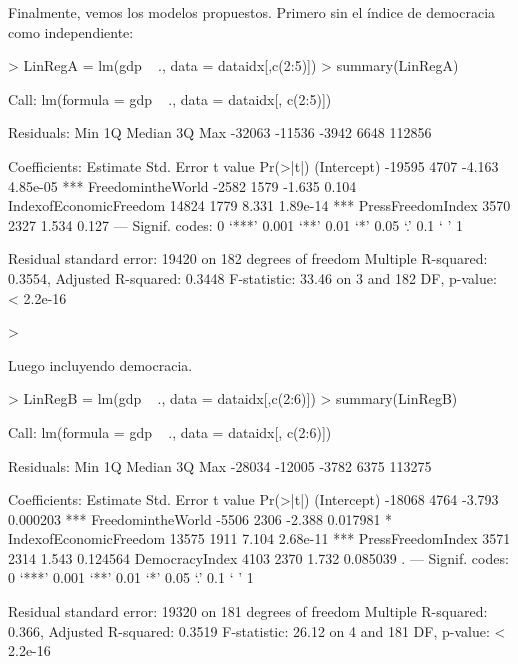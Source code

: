 \documentclass{article}
\begin{document}
Finalmente, vemos los modelos propuestos. Primero sin el índice de democracia como independiente:
\begin{Schunk}
\begin{Sinput}
> LinRegA = lm(gdp ~ ., data = dataidx[,c(2:5)])
> summary(LinRegA)
\end{Sinput}
\begin{Soutput}
Call:
lm(formula = gdp ~ ., data = dataidx[, c(2:5)])

Residuals:
   Min     1Q Median     3Q    Max 
-32063 -11536  -3942   6648 112856 

Coefficients:
                       Estimate Std. Error t value Pr(>|t|)    
(Intercept)              -19595       4707  -4.163 4.85e-05 ***
FreedomintheWorld         -2582       1579  -1.635    0.104    
IndexofEconomicFreedom    14824       1779   8.331 1.89e-14 ***
PressFreedomIndex          3570       2327   1.534    0.127    
---
Signif. codes:  0 ‘***’ 0.001 ‘**’ 0.01 ‘*’ 0.05 ‘.’ 0.1 ‘ ’ 1

Residual standard error: 19420 on 182 degrees of freedom
Multiple R-squared:  0.3554,	Adjusted R-squared:  0.3448 
F-statistic: 33.46 on 3 and 182 DF,  p-value: < 2.2e-16
\end{Soutput}
\begin{Sinput}
> 
\end{Sinput}
\end{Schunk}

Luego incluyendo democracia.

\begin{Schunk}
\begin{Sinput}
> LinRegB = lm(gdp ~ ., data = dataidx[,c(2:6)])
> summary(LinRegB)
\end{Sinput}
\begin{Soutput}
Call:
lm(formula = gdp ~ ., data = dataidx[, c(2:6)])

Residuals:
   Min     1Q Median     3Q    Max 
-28034 -12005  -3782   6375 113275 

Coefficients:
                       Estimate Std. Error t value Pr(>|t|)    
(Intercept)              -18068       4764  -3.793 0.000203 ***
FreedomintheWorld         -5506       2306  -2.388 0.017981 *  
IndexofEconomicFreedom    13575       1911   7.104 2.68e-11 ***
PressFreedomIndex          3571       2314   1.543 0.124564    
DemocracyIndex             4103       2370   1.732 0.085039 .  
---
Signif. codes:  0 ‘***’ 0.001 ‘**’ 0.01 ‘*’ 0.05 ‘.’ 0.1 ‘ ’ 1

Residual standard error: 19320 on 181 degrees of freedom
Multiple R-squared:  0.366,	Adjusted R-squared:  0.3519 
F-statistic: 26.12 on 4 and 181 DF,  p-value: < 2.2e-16
\end{Soutput}
\end{Schunk}
\end{document}
